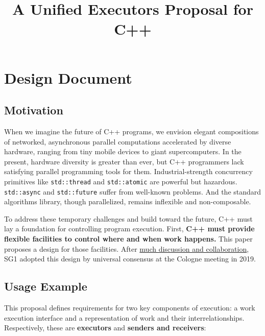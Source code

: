 \documentclass[a4paper,12pt,notitlepage,twoside,openright]{article}
\title{A Unified Executors Proposal for C++}
\author{}
\date{}
\begin{document}
\maketitle

\hypertarget{design-document}{%
\section{Design Document}\label{design-document}}

\hypertarget{motivation}{%
\subsection{Motivation}\label{motivation}}

When we imagine the future of C++ programs, we envision elegant
compositions of networked, asynchronous parallel computations
accelerated by diverse hardware, ranging from tiny mobile devices to
giant supercomputers. In the present, hardware diversity is greater than
ever, but C++ programmers lack satisfying parallel programming tools for
them. Industrial-strength concurrency primitives like
\texttt{std::thread} and \texttt{std::atomic}
are powerful but hazardous. \texttt{std::async} and
\texttt{std::future} suffer from well-known problems. And
the standard algorithms library, though parallelized, remains inflexible
and non-composable.

To address these temporary challenges and build toward the future, C++
must lay a foundation for controlling program execution. First,
\textbf{C++ must provide flexible facilities to control where and when
work happens.} This paper proposes a design for those facilities. After
\protect\hyperlink{appendix-executors-bibilography}{much discussion and
collaboration}, SG1 adopted this design by universal consensus at the
Cologne meeting in 2019.

\hypertarget{usage-example}{%
\subsection{Usage Example}\label{usage-example}}

This proposal defines requirements for two key components of execution:
a work execution interface and a representation of work and their
interrelationships. Respectively, these are \textbf{executors} and
\textbf{senders and receivers}:
\end{document}

